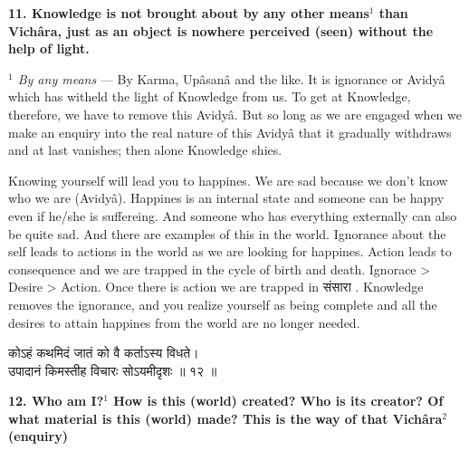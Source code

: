 \documentclass{article}
\begin{document}
\textbf{11. Knowledge is not brought about by any other means$^1$ than Vichâra,
just as an object is nowhere perceived (seen) without the help of light.}

{\small\textit{$^1$ By any means} --- By Karma, Upâsanâ and the like. It is ignorance or Avidyâ which has witheld the light of Knowledge from us. To get at Knowledge, therefore, we have to remove this Avidyâ. But so long as we are engaged when we make an enquiry into the real nature of this Avidyâ that it gradually withdraws and at last vanishes; then alone Knowledge shies.}
\begin{oframed}
Knowing yourself will lead you to happines. We are sad because we don't know
who we are (Avidyâ).  Happines is an internal state and someone can be happy
even if he/she is suffereing. And someone who has everything externally can
also be quite sad. And there are examples of this in the world.  Ignorance
about the self leads to actions in the world as we are looking for happines.
Action leads to consequence and we are trapped in the cycle of birth and death.
Ignorace > Desire > Action. Once there is action we are trapped in 
\texthindi{संसारा}
. Knowledge removes the ignorance, and you realize yourself as being complete
and all the desires to attain happines from the world are no longer needed.
\end{oframed}



\bigskip

\begin{large}
\begin{center}
    \begin{hindi}

	कोऽहं कथमिदं जातं को वै कर्ताऽस्य विधते।\\
    उपादानं किमस्तीह विचारः सोऽयमीदृशः ॥ १२ ॥

    \end{hindi}
\end{center}
\end{large}

\textbf{ 12. Who am I?$^1$ How is this (world) created? Who is its creator? Of
what material is this (world) made? This is the way of that Vichâra$^2$
(enquiry) }
\end{document}
